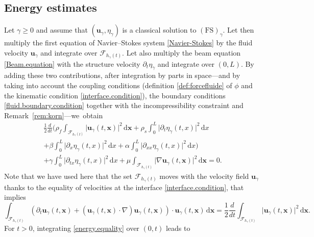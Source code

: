 \documentclass[10pt]{amsart}
\let\mathcal\mathscr
\newcommand{\FS}{\mathrm{FS}}
\theoremstyle{remark}
\theoremstyle{definition}
\newcommand{\ug}{\boldsymbol{u}}
\newcommand{\xg}{\boldsymbol{x}}
\newcommand{\dd}{\,\mathrm{d}}
\begin{document}
\subsection{Energy estimates}
Let $\gamma \geq 0 $ and assume that $(\ug_\gamma, \eta_\gamma)$ is a classical solution to $(\FS)_{\gamma}$. Let then multiply the first equation of Navier--Stokes system \eqref{Navier-Stokes} by the fluid velocity $\ug_\gamma$ and integrate over $\mathcal{F}_{h_\gamma(t)}$. Let also multiply the beam equation \eqref{Beam.equation} with the structure velocity $\partial_t\eta_{\gamma}$ and integrate over $(0, L)$. By adding these two contributions, after integration by parts in space---and by taking into account the coupling conditions (definition \eqref{def:forcefluide} of $\phi$ and the kinematic condition \eqref{interface.condition}), the boundary conditions \eqref{fluid.boundary.condition} together with the incompressibility constraint and Remark~\ref{rem:korn}---we~obtain
\begin{multline}\label{energy.equality}
\frac{1}{2}\frac{d}{dt}\biggl(\rho_{f}\int_{\mathcal{F}_{h_{\gamma}(t)}}\vert\ug_{\gamma}(t, \xg) \vert^{2} \dd\xg+ \rho_{s}\int_{0}^{L}\vert\partial_{t}\eta_{\gamma}(t, x) \vert^{2}\dd x \\
 +\beta\int_{0}^{L}\vert\partial_{x}\eta_{\gamma}(t, x) \vert^{2}\dd x+\alpha\int_{0}^{L}\vert\partial_{xx}\eta_{\gamma}(t, x)\vert^{2} \dd x\biggr)\\
 +\gamma\int_{0}^{L}\vert\partial_{tx}\eta_{\gamma}(t, x)\vert^{2} \dd x+ \mu\int_{\mathcal{F}_{h_{\gamma}(t)}}\vert \nabla\ug_{\gamma}(t, \xg) \vert^{2}\dd \xg=0.
\end{multline}
Note that we have used here that the set ${\mathcal{F}_{h_{\gamma}(t)}}$ moves with the velocity field $\ug_{\gamma}$ thanks to the equality of velocities at the interface \eqref{interface.condition}, that implies
\[
\int_{\mathcal{F}_{h_{\gamma}(t)}}(\partial_t\ug_\gamma(t, \xg)+(\ug_{\gamma}(t, \xg)\cdot\nabla )\ug_{\gamma}(t, \xg))\cdot \ug_{\gamma}(t, \xg)\dd\xg = \frac{1}{2}\frac{d}{dt}\int_{\mathcal{F}_{h_{\gamma}(t)}}\vert\ug_{\gamma}(t, \xg) \vert^{2} \dd\xg.
\]
For $t >0$, integrating \eqref{energy.equality} over $(0, t)$ leads to
\end{document}
